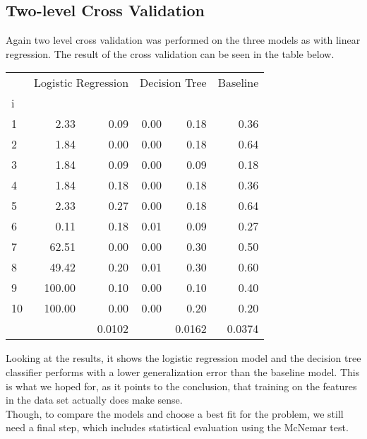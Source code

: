 \subsection{Two-level Cross Validation}
Again two level cross validation was performed on the three models as with linear regression. The result of the cross validation can be seen in the table below.
\begin{table}[H]
		\centering
	\begin{tabular}{lrrrrr}
		\jl{Outer fold}	& \multicolumn{2}{c}{Logistic Regression}	& \multicolumn{2}{c}{Decision Tree}	& Baseline	\\
		\jl i&\jl{$ h_i^* $}	&\jl{$ E_i^{\text{test}} $}	&\jl{$ \lambda_i^* $}	&\jl{$ E_i^{\text{test}} $}	&\jl{$ E_i^{\text{test}} $}	\\\hline
        1 & 2.33 &  0.09 &       0.00 &     0.18 &         0.36 \\
		2 & 1.84 &  0.00 &       0.00 &     0.18 &         0.64 \\
		3 & 1.84 &  0.09 &       0.00 &     0.09 &         0.18 \\
		4 & 1.84 &  0.18 &       0.00 &     0.18 &         0.36 \\
		5 & 2.33 &  0.27 &       0.00 &     0.18 &         0.64 \\
		6 & 0.11 &  0.18 &       0.01 &     0.09 &         0.27 \\
		7 & 62.51 & 0.00 &       0.00 &     0.30 &         0.50 \\
		8 & 49.42 & 0.20 &       0.01 &     0.30 &         0.60 \\
		9 & 100.00 & 0.10 &       0.00 &     0.10 &         0.40 \\
		10& 100.00 & 0.00 &       0.00 &     0.20 &         0.20 \\
		\hline
		\jl{$ \hat E^{\text{gen}} $}  & & 0.0102 & &0.0162 & 0.0374
	\end{tabular}
\end{table}
\noindent
Looking at the results, it shows the logistic regression model and the decision tree classifier performs with a lower generalization error than the baseline model. This is what we hoped for, as it points to the conclusion, that training on the features in the data set actually does make sense. 
\\
Though, to compare the models and choose a best fit for the problem, we still need a final step, which includes statistical evaluation using the McNemar test.

